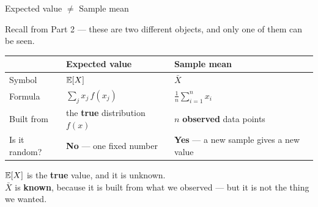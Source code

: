 \documentclass[9pt,english,aspectratio=169]{beamer}
\begin{document}






\begin{frame}{Expected value $\neq$ Sample mean}

  Recall from Part 2 --- these are two different objects, and only one of them
  can be seen.

  \vspace{0.8em}

  \centering
  \renewcommand{\arraystretch}{1.3}
  {
  \begin{tabular}{@{} l p{4.3cm} p{4.9cm} @{}}
    \toprule
     & \textbf{Expected value} & \textbf{Sample mean} \\
    \midrule
    Symbol & $\mathbb{E}[X]$ & $\bar{X}$ \\

    Formula & $\sum_j x_j\, f(x_j)$
            & $\frac{1}{n}\sum_{i=1}^{n} x_i$ \\

    Built from & the \textbf{true} distribution $f(x)$
               & $n$ \textbf{observed} data points \\

    Is it random? & \textbf{No} --- one fixed number
                  & \textbf{Yes} --- a new sample gives a new value \\
    \bottomrule
  \end{tabular}}
  \pause

  \vspace{1.2em}
  \raggedright
  \begin{insightbox}
    $\mathbb{E}[X]$ is the \textbf{true} value, and it is unknown.\\
    
    $\bar{X}$ is \textbf{known}, because it is built from what we observed --- but it is not the thing we wanted.
  \end{insightbox}

\end{frame}
\end{document}
